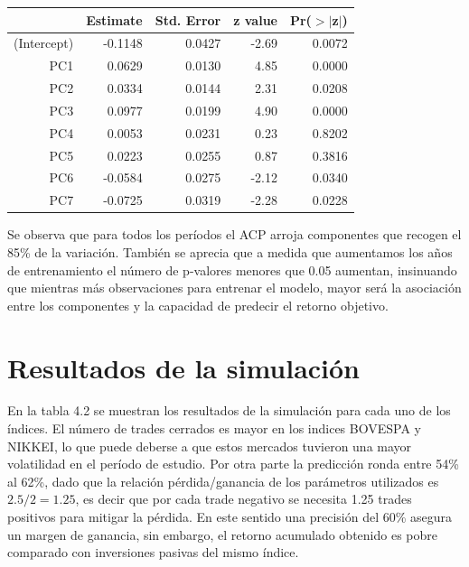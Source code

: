 \documentclass[a4paper,12pt]{Latex/Classes/PhDthesisPSnPDF}
\begin{document}
\begin{center}
\begin{table}[ht]
\centering
\begin{tabular}{rrrrr}
  \hline
 & Estimate & Std. Error & z value & Pr($>$$|$z$|$) \\ 
  \hline
(Intercept) & -0.1148 & 0.0427 & -2.69 & 0.0072 \\ 
  PC1 & 0.0629 & 0.0130 & 4.85 & 0.0000 \\ 
  PC2 & 0.0334 & 0.0144 & 2.31 & 0.0208 \\ 
  PC3 & 0.0977 & 0.0199 & 4.90 & 0.0000 \\ 
  PC4 & 0.0053 & 0.0231 & 0.23 & 0.8202 \\ 
  PC5 & 0.0223 & 0.0255 & 0.87 & 0.3816 \\ 
  PC6 & -0.0584 & 0.0275 & -2.12 & 0.0340 \\ 
  PC7 & -0.0725 & 0.0319 & -2.28 & 0.0228 \\ 
   \hline
\end{tabular}
\end{table}\end{center}

Se observa que para todos los períodos el ACP arroja componentes que recogen el 85\% de la variación. También se aprecia que a medida que aumentamos los años de entrenamiento el número de p-valores menores que 0.05 aumentan, insinuando que mientras más observaciones para entrenar el modelo, mayor será la asociación entre los componentes y la capacidad de predecir el retorno objetivo.

\section{Resultados de la simulación}


En la tabla 4.2 se muestran los resultados de la simulación para cada uno de los índices. El número de trades cerrados es mayor en los indices BOVESPA y NIKKEI, lo que puede deberse a que estos mercados tuvieron una mayor volatilidad en el período de estudio. Por otra parte la predicción ronda entre 54\% al 62\%, dado que la relación pérdida/ganancia de los parámetros utilizados es $2.5/2 = 1.25$, es decir que por cada trade negativo se necesita 1.25 trades positivos para mitigar la pérdida. En este sentido una precisión del 60\% asegura un margen de ganancia, sin embargo, el retorno acumulado obtenido es pobre comparado con inversiones pasivas del mismo índice. 
\end{document}
